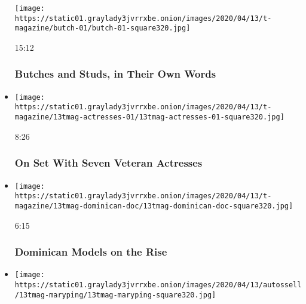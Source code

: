 \begin{itemize}
  \texttt{[image: https://static01.graylady3jvrrxbe.onion/images/2020/04/13/t-magazine/butch-01/butch-01-square320.jpg]}

  15:12

  \hypertarget{butches-and-studs-in-their-own-words}{%
  \subsubsection{Butches and Studs, in Their Own
  Words}\label{butches-and-studs-in-their-own-words}}
\item
  \href{https://www.nytimes3xbfgragh.onion/video/t-magazine/entertainment/100000007077732/on-set-with-seven-veteran-actresses.html?action=click\&module=video-series-bar\&region=header\&pgtype=Article\&playlistId=video/t-magazine}{}

  \texttt{[image: https://static01.graylady3jvrrxbe.onion/images/2020/04/13/t-magazine/13tmag-actresses-01/13tmag-actresses-01-square320.jpg]}

  8:26

  \hypertarget{on-set-with-seven-veteran-actresses}{%
  \subsubsection{On Set With Seven Veteran
  Actresses}\label{on-set-with-seven-veteran-actresses}}
\item
  \href{https://www.nytimes3xbfgragh.onion/video/t-magazine/100000007077728/dominican-models-on-the-rise.html?action=click\&module=video-series-bar\&region=header\&pgtype=Article\&playlistId=video/t-magazine}{}

  \texttt{[image: https://static01.graylady3jvrrxbe.onion/images/2020/04/13/t-magazine/13tmag-dominican-doc/13tmag-dominican-doc-square320.jpg]}

  6:15

  \hypertarget{dominican-models-on-the-rise}{%
  \subsubsection{Dominican Models on the
  Rise}\label{dominican-models-on-the-rise}}
\item
  \href{https://www.nytimes3xbfgragh.onion/video/t-magazine/100000007066012/make-t-something-mary-ping.html?action=click\&module=video-series-bar\&region=header\&pgtype=Article\&playlistId=video/t-magazine}{}

  \texttt{[image: https://static01.graylady3jvrrxbe.onion/images/2020/04/13/autossell/13tmag-maryping/13tmag-maryping-square320.jpg]}


\end{itemize}
